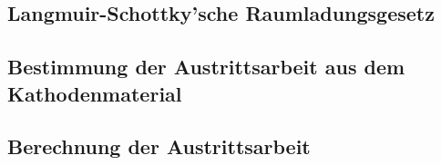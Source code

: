 \subsection{Langmuir-Schottky'sche Raumladungsgesetz}

\subsection{Bestimmung der Austrittsarbeit aus dem Kathodenmaterial}

\subsection{Berechnung der Austrittsarbeit}